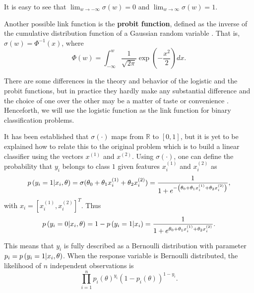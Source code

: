 It is easy to see that $\lim_{w \to -\infty} \sigma(w) = 0$ and $\lim_{w \to \infty} \sigma(w) = 1$.


Another possible link function is the \textbf{probit function}, defined as the inverse of the cumulative distribution function of a Gaussian random variable \cite[p.~296]{friedman2001elements}. That is, $\sigma(w) = \Phi^{-1}\left( x \right)$,
where
\begin{equation}
  \Phi(w) = \int_{-\infty}^w \frac{1}{\sqrt{2 \pi}} \exp{\left( -\frac{x^2}{2} \right)} dx.
\end{equation}

There are some differences in the theory and behavior of the logistic and the probit functions, but in practice they hardly make any substantial difference and the choice of one over the other may be a matter of taste or convenience \cite[p.~118]{gelman2006data}. Henceforth, we will use the logistic function as the link function for binary classification problems.

It has been established that $\sigma \left( \cdot \right)$ maps from $\mathbb{R}$ to $\left[ 0,1 \right]$, but it is yet to be explained how to relate this to the original problem which is to build a linear classifier using the vectors $x^{(1)}$ and $x^{(2)}$. Using  $\sigma \left( \cdot \right)$, one can define the probability that $y_i$ belongs to class $1$ given features $x_i^{(1)}$ and $x_i^{(2)}$ as
\begin{equation}
  p\left( y_i = 1 | x_i, \theta \right) = \sigma(\theta_0 + \theta_1 x_i^{(1)} + \theta_2 x_i^{(2)}) = \frac{1}{1 + e^{-\left( \theta_0 + \theta_1 x_i^{(1)} + \theta_2 x_i^{(2)} \right)}},
\end{equation}
with $x_i = \left[ x_i^{(1)}, x_i^{(2)} \right]^T$. Thus
\begin{equation}
  p\left( y_i = 0 | x_i, \theta \right) = 1 - p\left( y_i = 1 | x_i \right) = \frac{1}{1 + e^{\theta_0 + \theta_1 x_i^{(1)} + \theta_2 x_i^{(2)}}}.
\end{equation}

This means that $y_i$ is fully described as a Bernoulli distribution with parameter $p_i =p\left( y_i = 1 | x_i, \theta \right)$. When the response variable is Bernoulli distributed, the likelihood of $n$ independent observations is
\begin{equation}
  \prod_{i = 1}^n  p_i(\theta)^{y_i}\left(1 - p_i(\theta) \right)^{1 - y_i}.
\end{equation}

